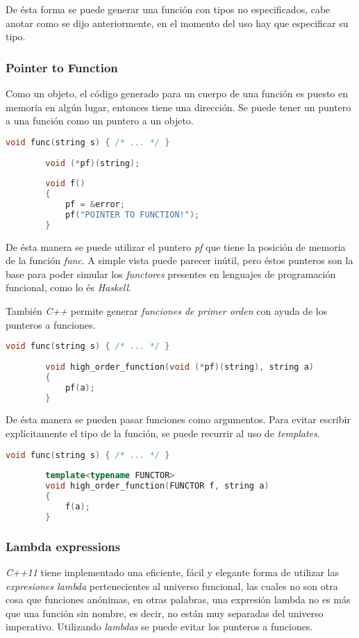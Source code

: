 		De ésta forma se puede generar una función con tipos no especificados, cabe anotar como se dijo anteriormente, en el momento del uso hay que especificar su tipo.
	
	\subsubsection{Pointer to Function}
		Como un objeto, el código generado para un cuerpo de una función es puesto en memoria en algún lugar, entonces tiene una dirección. Se puede tener un puntero a una función como un puntero a un objeto. \cite{Bjarne}
		
		\begin{lstlisting}[language=C++, caption="Puntero a una función"]
		void func(string s) { /* ... */ }
		
		void (*pf)(string);
		
		void f()
		{
			pf = &error;
			pf("POINTER TO FUNCTION!");
		}
		\end{lstlisting}
		
		De ésta manera se puede utilizar el puntero \emph{pf} que tiene la posición de memoria de la función \emph{func}. A simple vista puede parecer inútil, pero éstos punteros son la base para poder simular los \emph{functores} presentes en lenguajes de programación funcional, como lo és \emph{Haskell}.
		
		También \emph{C++} permite generar \emph{funciones de primer orden} con ayuda de los punteros a funciones.
		
		\begin{lstlisting}[language=C++, caption="Funciones de primer orden"]
		void func(string s) { /* ... */ }
		
		void high_order_function(void (*pf)(string), string a)
		{
			pf(a);
		}
		\end{lstlisting}
		
		De ésta manera se pueden pasar funciones como argumentos. Para evitar escribir explícitamente el tipo de la función, se puede recurrir al uso de \emph{templates}.
		
		\begin{lstlisting}[language=C++, caption="Funciones de primer orden con templates"]
		void func(string s) { /* ... */ }
		
		template<typename FUNCTOR>
		void high_order_function(FUNCTOR f, string a)
		{ 
			f(a);
		}
		\end{lstlisting}
		
	\subsubsection{Lambda expressions}
		\emph{C++11} tiene implementado una eficiente, fácil y elegante forma de utilizar las \emph{expresiones lambda} pertenecientes al universo funcional, las cuales no son otra cosa que funciones anónimas, en otras palabras, una expresión lambda no es más que una función sin nombre, es decir, no están muy separadas del universo imperativo. Utilizando \emph{lambdas} se puede evitar los punteros a funciones.
		
